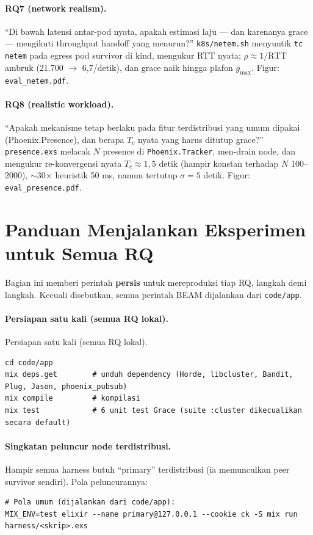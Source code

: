 \documentclass[11pt]{article}
\newcommand{\code}[1]{\texttt{\small #1}}
\begin{document}
\paragraph{RQ7 (network realism).} ``Di bawah latensi antar-pod nyata, apakah estimasi laju --- dan
karenanya grace --- mengikuti throughput handoff yang menurun?'' \code{k8s/netem.sh} menyuntik
\code{tc netem} pada egress pod survivor di kind, mengukur RTT nyata; $\rho \approx 1/\text{RTT}$
ambruk (21.700 $\rightarrow$ 6{,}7/detik), dan grace naik hingga plafon $g_{\max}$. Figur:
\code{eval\_netem.pdf}.

\paragraph{RQ8 (realistic workload).} ``Apakah mekanisme tetap berlaku pada fitur terdistribusi yang
umum dipakai (Phoenix.Presence), dan berapa $T_c$ nyata yang harus ditutup grace?'' \code{presence.exs}
melacak $N$ presence di \code{Phoenix.Tracker}, men-drain node, dan mengukur re-konvergensi nyata
$T_c \approx 1{,}5$ detik (hampir konstan terhadap $N$ 100--2000), $\sim$30$\times$ heuristik 50 ms,
namun tertutup $\sigma = 5$ detik. Figur: \code{eval\_presence.pdf}.

\section{Panduan Menjalankan Eksperimen untuk Semua RQ}
\label{sec:menjalankan}

Bagian ini memberi perintah \textbf{persis} untuk mereproduksi tiap RQ, langkah demi langkah. Kecuali
disebutkan, semua perintah BEAM dijalankan dari \code{code/app}.

\paragraph{Persiapan satu kali (semua RQ lokal).}
Persiapan satu kali (semua RQ lokal).

\begin{lstlisting}[style=sh]
cd code/app
mix deps.get        # unduh dependency (Horde, libcluster, Bandit, Plug, Jason, phoenix_pubsub)
mix compile         # kompilasi
mix test            # 6 unit test Grace (suite :cluster dikecualikan secara default)
\end{lstlisting}

\paragraph{Singkatan peluncur node terdistribusi.} Hampir semua harness butuh ``primary''
terdistribusi (ia memunculkan peer survivor sendiri). Pola peluncurannya:
\begin{lstlisting}[style=sh]
# Pola umum (dijalankan dari code/app):
MIX_ENV=test elixir --name primary@127.0.0.1 --cookie ck -S mix run harness/<skrip>.exs
\end{lstlisting}
\end{document}
